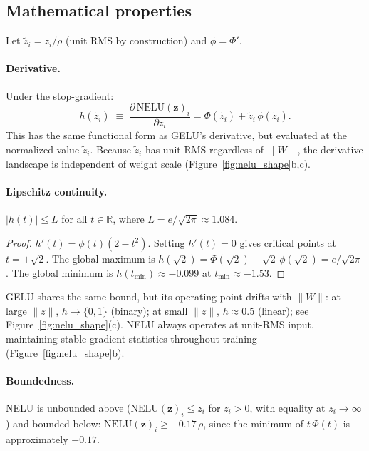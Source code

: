 \subsection{Mathematical properties}\label{sec:math_properties}

Let $\tilde{z}_i = z_i / \rho$ (unit RMS by construction) and $\phi = \Phi'$.

\paragraph{Derivative.}
Under the stop-gradient:
\begin{equation}\label{eq:nelu_deriv}
    h(\tilde{z}_i) \;\equiv\; \frac{\partial\,\mathrm{NELU}(\mathbf{z})_i}{\partial z_i} = \Phi(\tilde{z}_i) + \tilde{z}_i\,\phi(\tilde{z}_i).
\end{equation}
This has the same functional form as GELU's derivative, but evaluated at the normalized value $\tilde{z}_i$.
Because $\tilde{z}_i$ has unit RMS regardless of $\|W\|$, the derivative landscape is independent of weight scale (Figure~\ref{fig:nelu_shape}b,c).

\paragraph{Lipschitz continuity.}
\begin{proposition}\label{prop:lipschitz}
$|h(t)| \leq L$ for all $t \in \mathbb{R}$, where $L = e/\sqrt{2\pi} \approx 1.084$.
\end{proposition}
\begin{proof}
$h'(t) = \phi(t)(2 - t^2)$.
Setting $h'(t) = 0$ gives critical points at $t = \pm\sqrt{2}$.
The global maximum is $h(\sqrt{2}) = \Phi(\sqrt{2}) + \sqrt{2}\,\phi(\sqrt{2}) = e/\sqrt{2\pi}$.
The global minimum is $h(t_{\min}) \approx -0.099$ at $t_{\min} \approx -1.53$.
\end{proof}
GELU shares the same bound, but its operating point drifts with $\|W\|$: at large $\|z\|$, $h \to \{0,1\}$ (binary); at small $\|z\|$, $h \approx 0.5$ (linear); see Figure~\ref{fig:nelu_shape}(c).
NELU always operates at unit-RMS input, maintaining stable gradient statistics throughout training (Figure~\ref{fig:nelu_shape}b).

\paragraph{Boundedness.}
NELU is unbounded above ($\mathrm{NELU}(\mathbf{z})_i \leq z_i$ for $z_i > 0$, with equality at $z_i \to \infty$) and bounded below: $\mathrm{NELU}(\mathbf{z})_i \geq -0.17\,\rho$, since the minimum of $t\,\Phi(t)$ is approximately $-0.17$.

